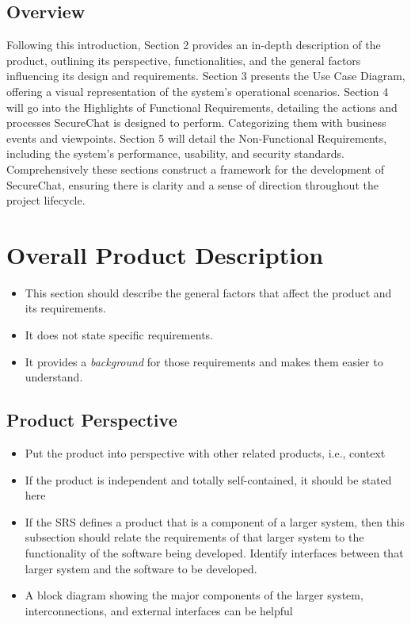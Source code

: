 \documentclass[]{article}
\begin{document}
\subsection{Overview}
\label{sub:overview}
Following this introduction, Section 2 provides an in-depth description of the product, outlining its perspective, functionalities, and the general factors influencing its design and requirements. Section 3 presents the Use Case Diagram, offering a visual representation of the system's operational scenarios. Section 4 will go into the Highlights of Functional Requirements, detailing the actions and processes SecureChat is designed to perform. Categorizing them with business events and viewpoints. Section 5 will detail the Non-Functional Requirements, including the system's performance, usability, and security standards. Comprehensively these sections construct a framework for the development of SecureChat, ensuring there is clarity and a sense of direction throughout the project lifecycle.


\section{Overall Product Description}
\label{sec:overall_description}

\begin{itemize}
	\item This section should describe the general factors that affect the product and its requirements. 
	\item It does not state specific requirements.
	\item It provides a \emph{background} for those requirements and makes them easier to understand.
\end{itemize}


\subsection{Product Perspective}
\label{sub:product_perspective}
\begin{itemize}
	\item Put the product into perspective with other related products, i.e., context
	\item If the product is independent and totally self-contained, it should be stated here
	\item If the SRS defines a product that is a component of a larger system, then this subsection should relate the requirements of that larger system to the functionality of the software being developed. Identify interfaces between that larger system and the software to be developed.
	\item A block diagram showing the major components of the larger system, interconnections, and external interfaces can be helpful
\end{itemize}
\end{document}
